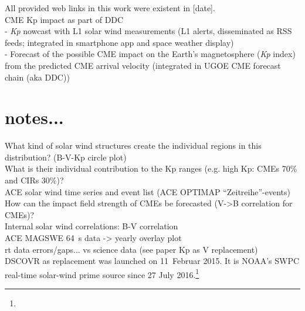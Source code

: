 All provided web links in this work were existent in [date].\\


CME Kp impact as part of DDC\\
- \textit{Kp} nowcast with L1 solar wind measurements (L1 alerts, disseminated as RSS feeds; integrated in smartphone app and space weather display)\\
- Forecast of the possible CME impact on the Earth's magnetosphere (\textit{Kp} index) from the predicted CME arrival velocity (integrated in UGOE CME forecast chain (aka DDC))\\


\section{notes...}

What kind of solar wind structures create the individual regions in this distribution? (B-V-Kp circle plot)\\
What is their individual contribution to the Kp ranges (e.g. high Kp: CMEs 70\% and CIRs 30\%)?\\

ACE solar wind time series and event list (ACE OPTIMAP ``Zeitreihe''-events)\\


How can the impact field strength of CMEs be forecasted (V->B correlation for CMEs)?\\
Internal solar wind correlations: B-V correlation\\
ACE MAGSWE 64~s data -> yearly overlay plot\\


rt data errors/gaps... vs science data (see paper Kp as V replacement)\\
DSCOVR as replacement was launched on 11~Februar 2015. It is NOAA's SWPC real-time solar-wind prime source since 27 July 2016.\footnote{}\\


